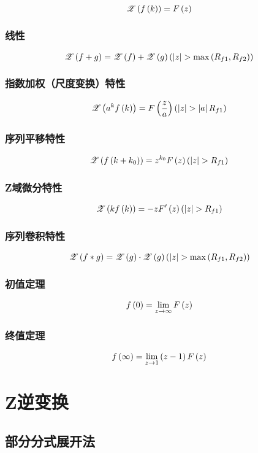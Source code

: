 \documentclass{article}
\begin{document}
\[\mathscr Z\left(f\left(k\right)\right)=F\left(z\right)\]

\subsubsection{线性}

\[\ztrans{f+g}=\ztrans{f}+\ztrans{g}\p{\abs{z}>\max\p{{R_{f1},R_{f2}}}}\]

\subsubsection{指数加权（尺度变换）特性}

\[\ztrans{a^k\fk}=F\p{\frac za}\p{\abs z>\abs aR_{f1}}\]

\subsubsection{序列平移特性}

\[\ztrans{f\p{k+k_0}}=z^{k_0}\fz\p{\abs{z}>R_{f1}}\]

\subsubsection{Z域微分特性}

\[\ztrans{k\fk}=-zF^\prime\p{z}\p{\abs{z}>R_{f1}}\]

\subsubsection{序列卷积特性}

\[\ztrans{f\ast g}=\ztrans{g}\cdot\ztrans{g}\p{\abs{z}>\max\p{{R_{f1},R_{f2}}}}\]

\subsubsection{初值定理}

\[f\left(0\right)=\lim_{z\to\infty}F\left(z\right)\]

\subsubsection{终值定理}

\[f\left(\infty\right)=\lim_{z\to1}\left(z-1\right)F\left(z\right)\]

\section{Z逆变换}

\subsection{部分分式展开法\label{Z变换部分分式展开法}}
\end{document}
